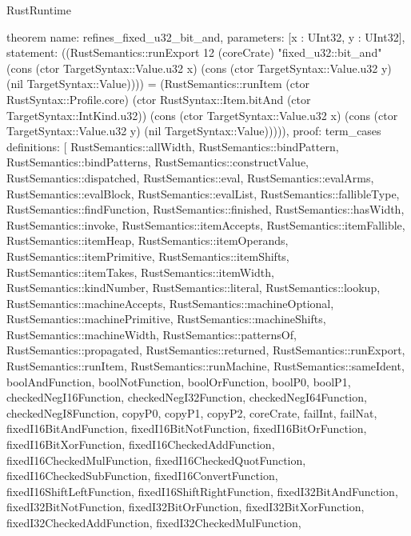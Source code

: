 \begin{lexlean}{RustRuntime}
\begin{semanticmodule}
theorem{
  name: refines_fixed_u32_bit_and,
  parameters: [x : UInt32, y : UInt32],
  statement: ((RustSemantics::runExport 12 (coreCrate) "fixed_u32::bit_and" (cons (ctor TargetSyntax::Value.u32 x) (cons (ctor TargetSyntax::Value.u32 y) (nil TargetSyntax::Value)))) = (RustSemantics::runItem (ctor RustSyntax::Profile.core) (ctor RustSyntax::Item.bitAnd (ctor TargetSyntax::IntKind.u32)) (cons (ctor TargetSyntax::Value.u32 x) (cons (ctor TargetSyntax::Value.u32 y) (nil TargetSyntax::Value))))),
  proof: term_cases{
    definitions: [
      RustSemantics::allWidth,
      RustSemantics::bindPattern,
      RustSemantics::bindPatterns,
      RustSemantics::constructValue,
      RustSemantics::dispatched,
      RustSemantics::eval,
      RustSemantics::evalArms,
      RustSemantics::evalBlock,
      RustSemantics::evalList,
      RustSemantics::fallibleType,
      RustSemantics::findFunction,
      RustSemantics::finished,
      RustSemantics::hasWidth,
      RustSemantics::invoke,
      RustSemantics::itemAccepts,
      RustSemantics::itemFallible,
      RustSemantics::itemHeap,
      RustSemantics::itemOperands,
      RustSemantics::itemPrimitive,
      RustSemantics::itemShifts,
      RustSemantics::itemTakes,
      RustSemantics::itemWidth,
      RustSemantics::kindNumber,
      RustSemantics::literal,
      RustSemantics::lookup,
      RustSemantics::machineAccepts,
      RustSemantics::machineOptional,
      RustSemantics::machinePrimitive,
      RustSemantics::machineShifts,
      RustSemantics::machineWidth,
      RustSemantics::patternsOf,
      RustSemantics::propagated,
      RustSemantics::returned,
      RustSemantics::runExport,
      RustSemantics::runItem,
      RustSemantics::runMachine,
      RustSemantics::sameIdent,
      boolAndFunction,
      boolNotFunction,
      boolOrFunction,
      boolP0,
      boolP1,
      checkedNegI16Function,
      checkedNegI32Function,
      checkedNegI64Function,
      checkedNegI8Function,
      copyP0,
      copyP1,
      copyP2,
      coreCrate,
      failInt,
      failNat,
      fixedI16BitAndFunction,
      fixedI16BitNotFunction,
      fixedI16BitOrFunction,
      fixedI16BitXorFunction,
      fixedI16CheckedAddFunction,
      fixedI16CheckedMulFunction,
      fixedI16CheckedQuotFunction,
      fixedI16CheckedSubFunction,
      fixedI16ConvertFunction,
      fixedI16ShiftLeftFunction,
      fixedI16ShiftRightFunction,
      fixedI32BitAndFunction,
      fixedI32BitNotFunction,
      fixedI32BitOrFunction,
      fixedI32BitXorFunction,
      fixedI32CheckedAddFunction,
      fixedI32CheckedMulFunction,
}}
\end{semanticmodule}
\end{lexlean}
